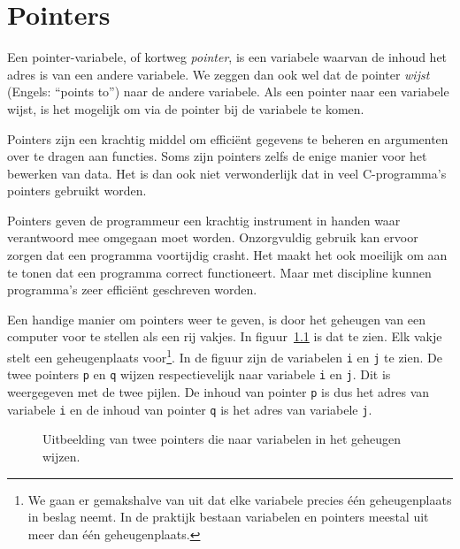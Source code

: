 \chapter{Pointers}
\label{cha:pointers}
\thispagestyle{empty}

Een pointer-variabele, of kortweg \textsl{pointer}, is een variabele waarvan de inhoud het adres is van een andere variabele. We zeggen dan ook wel dat de pointer \textsl{wijst} (Engels: ``points to'') naar de andere variabele. Als een pointer naar een variabele wijst, is het mogelijk om via de pointer bij de variabele te komen.

Pointers zijn een krachtig middel om efficiënt gegevens te beheren en argumenten over te dragen aan functies. Soms zijn pointers zelfs de enige manier voor het bewerken van data. Het is dan ook niet verwonderlijk dat in veel C-programma's pointers gebruikt worden. 

Pointers geven de programmeur een krachtig instrument in handen waar verantwoord mee omgegaan moet worden.
Onzorgvuldig gebruik kan ervoor zorgen dat een programma voortijdig crasht. Het maakt het ook moeilijk om aan te tonen dat een programma correct functioneert. Maar met discipline kunnen
programma’s zeer efficiënt geschreven worden.

Een handige manier om pointers weer te geven, is door het geheugen van een computer voor te stellen als een rij vakjes. In figuur~\ref{fig:poiinmem} is dat te zien. Elk vakje stelt een geheugenplaats voor\footnote{We gaan er gemakshalve van uit dat elke variabele precies één geheugenplaats in beslag neemt. In de praktijk bestaan variabelen en pointers meestal uit meer dan één geheugenplaats.}. In de figuur zijn de variabelen \texttt{i} en \texttt{j} te zien. De twee pointers \texttt{p} en \texttt{q} wijzen respectievelijk naar variabele \texttt{i} en \texttt{j}. Dit is weergegeven met de twee pijlen. De inhoud van pointer \texttt{p} is dus het adres van variabele \texttt{i} en de inhoud van pointer \texttt{q} is het adres van variabele \texttt{j}.

\vspace*{-0.5\baselineskip}
\begin{figure}[!ht]
\centering
{}
\caption{Uitbeelding van twee pointers die naar variabelen in het geheugen wijzen.}
\label{fig:poiinmem}
\end{figure}

